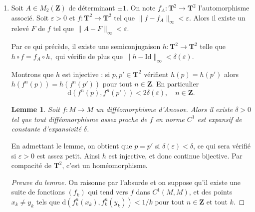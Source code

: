 \documentclass[a4paper,12pt,openany]{article}
\theoremstyle{plain}
\newtheorem{lem}{Lemme}
\theoremstyle{definition}
\newcommand{\dd}{\mathrm{d}}
\newcommand{\T}{\mathbf{T}}
\newcommand{\Z}{\mathbf{Z}}
\newcommand{\Id}{\mathrm{Id}}
\begin{document}
\begin{enumerate}[resume]
 






Soit $n \in \Z$ ; on a $\|A^nH(p_k) - F^n(p_k)\| \leq \delta(r)$ et donc en faisant $k \to +\infty$ on obtient $\|A^nq - F^n(p)\| \leq \delta(r)$. 
 


Ceci implique que $q = H(p)$ par unicit\'e du pistage. Ainsi $H(p)$ est l'unique valeur d'adh\'erence de la suite $(H(p_k))$ et donc $H(p_k) \to H(p).$

 


$H$ est donc continue et $H - \Id$ est born\'ee, on peut donc appliquer la question \textbf{5.} pour obtenir que $H = \Id + (H - \Id)$ est surjective.

\item Soit $A \in M_2(\Z)$ de d\'eterminant $\pm1$. On note $f_A : \T^2 \to \T^2$ l'automorphisme associ\'e. Soit $\varepsilon > 0$ et $f : \T^2 \to \T^2$ tel que $\|f - f_A\|_\infty < \varepsilon$. Alors il existe un relev\'e $F$ de $f$ tel que $\|A - F\|_\infty < \varepsilon$. 

 


Par ce qui pr\'ec\`ede, il existe une semiconjugaison $h : \T^2 \to \T^2$ telle que $h \circ f = f_A \circ h,$ qui v\'erifie de plus que $\|h - \Id\|_\infty < \delta(\varepsilon).$

 


Montrons que $h$ est injective : si $p,p' \in \T^2$ v\'erifient $h(p) = h(p')$ alors $h(f^n(p)) = h(f^n(p'))$ pour tout $n \in \Z$. En particulier 
$$\dd(f^n(p), f^n(p')) < 2 \delta(\varepsilon), \quad n \in \Z.$$





\begin{lem}
Soit $f : M \to M$ un diff\'eomorphisme d'Anosov. Alors il existe $\delta > 0$ tel que tout diff\'eomorphisme assez proche de $f$ en norme $C^1$ est expansif de constante d'expansivit\'e $\delta$.
\end{lem} 

En admettant le lemme, on obtient que $p = p'$ si $\delta(\varepsilon) < \delta$, ce qui sera v\'erifi\'e si $\varepsilon > 0$ est assez petit. Ainsi $h$ est injective, et donc continue bijective. Par compacit\'e de $\T^2$, c'est un hom\'eomorphisme.

\begin{proof}[Preuve du lemme]
On raisonne par l'absurde et on suppose qu'il existe une suite de fonctions $(f_k)$ qui tend vers $f$ dans $C^1(M, M)$, et des points $x_k \neq y_k$ tels que $\dd(f_k^n(x_k), f_k^n(y_k)) < 1 / k$ pour tout $n \in \Z$ et tout $k$.


\end{proof}
\end{enumerate}
\end{document}
